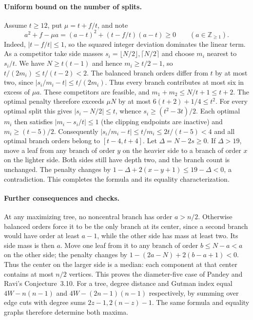 \documentclass[11pt,a4paper]{article}
\begin{document}
\paragraph{Uniform bound on the number of splits.}
Assume \(t\ge12\), put \(\mu=t+f/t\), and note
\[
       a^2+f-\mu a=(a-t)^2+(t-f/t)(a-t)\ge0
                         \qquad(a\in\mathbb Z_{\ge1}).
\]
Indeed, \(|t-f/t|\le1\), so the squared integer deviation dominates the
linear term. As a competitor take side masses
\(s_i=\lfloor N/2\rfloor,\lceil N/2\rceil\) and choose \(m_i\) nearest
to \(s_i/t\). We have \(N\ge t(t-1)\) and hence
\(m_i\ge t/2-1\), so \(t/(2m_i)\le t/(t-2)<2\).
The balanced branch orders differ from \(t\) by at most two, since
\(|s_i/m_i-t|\le t/(2m_i)\).
Thus every branch contributes at most six in excess of \(\mu a\).
These competitors are feasible, and
\(m_1+m_2\le N/t+1\le t+2\).
The optimal penalty therefore exceeds \(\mu N\) by at most
\(6(t+2)+1/4\le t^2\). For every optimal split this gives
\(|s_i-N/2|\le t\), whence
\(s_i\ge(t^2-3t)/2\).
Each optimal \(m_i\) then satisfies \(|m_i-s_i/t|\le1\)
(the clipping endpoints are inactive) and
\(m_i\ge(t-5)/2\). Consequently
\(|s_i/m_i-t|\le t/m_i\le2t/(t-5)<4\) and all optimal branch
orders belong to \([t-4,t+4]\).
Let \(\Delta=N-2s\ge0\).
If \(\Delta>19\), move a leaf from any branch of order \(y\) on the heavier
side to a branch of order \(x\) on the lighter side. Both sides still have
depth two, and the branch count is unchanged. The penalty changes by
\(1-\Delta+2(x-y+1)\le19-\Delta<0\), a contradiction.
This completes the formula and its equality characterization.

\paragraph{Further consequences and checks.}
At any maximizing tree, no noncentral branch has order $a>n/2$. Otherwise balanced orders force it to be the only branch at its center, since a second branch would have order at least $a-1$, while the other side has mass at least two. Its side mass is then $a$. Move one leaf from it to any branch of order $b\le N-a<a$ on the other side; the penalty changes by $1-(2a-N)+2(b-a+1)<0$. Thus the center on the larger side is a median: each component at that center contains at most $n/2$ vertices. This proves the diameter-five case of Pandey and Ravi's Conjecture~3.10. For a tree, degree distance and Gutman index equal $4W-n(n-1)$ and $4W-(2n-1)(n-1)$ respectively, by summing over edge cuts with degree sums $2z-1,2(n-z)-1$. The same formula and equality graphs therefore determine both maxima.
\end{document}

